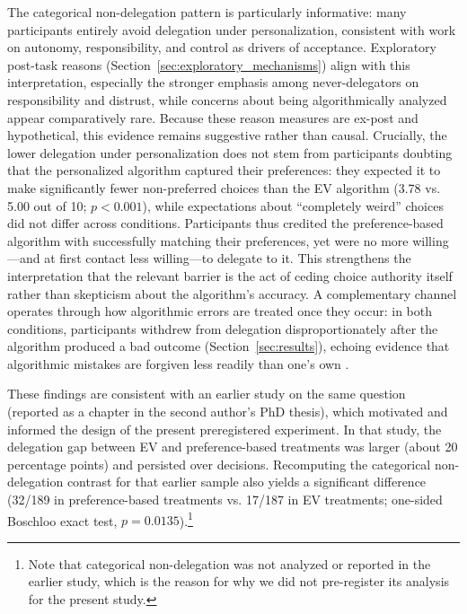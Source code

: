 \documentclass[a4paper, 12pt, fleqn]{article}
\theoremstyle{definition}
\begin{document}
The categorical non-delegation pattern is particularly informative: many participants entirely avoid delegation under personalization, consistent with work on autonomy, responsibility, and control as drivers of acceptance. Exploratory post-task reasons (Section~\ref{sec:exploratory_mechanisms}) align with this interpretation, especially the stronger emphasis among never-delegators on responsibility and distrust, while concerns about being algorithmically analyzed appear comparatively rare. Because these reason measures are ex-post and hypothetical, this evidence remains suggestive rather than causal. Crucially, the lower delegation under personalization does not stem from participants doubting that the personalized algorithm captured their preferences: they expected it to make significantly fewer non-preferred choices than the EV algorithm (3.78 vs. 5.00 out of 10; $p < 0.001$), while expectations about ``completely weird'' choices did not differ across conditions. Participants thus credited the preference-based algorithm with successfully matching their preferences, yet were no more willing---and at first contact less willing---to delegate to it. This strengthens the interpretation that the relevant barrier is the act of ceding choice authority itself rather than skepticism about the algorithm's accuracy. A complementary channel operates through how algorithmic errors are treated once they occur: in both conditions, participants withdrew from delegation disproportionately after the algorithm produced a bad outcome (Section~\ref{sec:results}), echoing evidence that algorithmic mistakes are forgiven less readily than one's own \citep{Dietvorst2018,Renier2021}.

These findings are consistent with an earlier study on the same question (reported as a chapter in the second author's PhD thesis), which motivated and informed the design of the present preregistered experiment. In that study, the delegation gap between EV and preference-based treatments was larger (about 20 percentage points) and persisted over decisions. Recomputing the categorical non-delegation contrast for that earlier sample also yields a significant difference (32/189 in preference-based treatments vs. 17/187 in EV treatments; one-sided Boschloo exact test, $p = 0.0135$).\footnote{Note that categorical non-delegation was not analyzed or reported in the earlier study, which is the reason for why we did not pre-register its analysis for the present study.}
\end{document}
